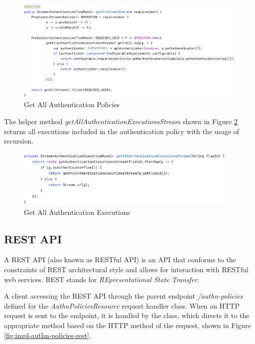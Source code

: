 \begin{figure}[htbp]
  \centering
  \includegraphics[width=1\textwidth]{img/sections/6-implementation/authnPolicyGetAllStream.png}
  \caption{Get All Authentication Policies}
  \label{fig:impl-authn-policies-get-all}
\end{figure}

The helper method \textit{getAllAuthenticationExecutionsStream} shown in Figure \ref{fig:impl-authn-policies-get-all-execs} returns all executions included in the authentication policy with the usage of recursion.

\begin{figure}[htbp]
  \centering
  \includegraphics[width=0.95\textwidth]{img/sections/6-implementation/authnPolicyGetAllExecutions.png}
  \caption{Get All Authentication Executions}
  \label{fig:impl-authn-policies-get-all-execs}
\end{figure}

\newpage
\subsection{REST API} \label{impl-authn-policies-rest}
A REST API (also known as RESTful API) is an API that conforms to the constraints of REST architectural style and allows for interaction with RESTful web services.
REST stands for \textit{REpresentational State Transfer}.\cite{impl-rest} 

A client accessing the REST API through the parent endpoint \textit{/authn-policies} defined for the \textit{AuthnPoliciesResource} request handler class.
When an HTTP request is sent to the endpoint, it is handled by the class, which directs it to the appropriate method based on the HTTP method of the request, shown in Figure \ref{fig:impl-authn-policies-rest}.

